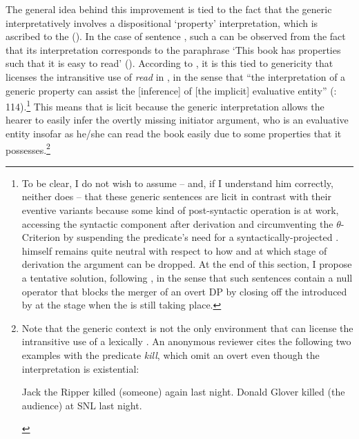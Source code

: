 \documentclass[output=paper,nonflat,newtxmath]{langsci/langscibook}
\begin{document}
\begin{exe}
\ex \label{ex:lenardic: 34}
\begin{xlist}
\label{ex:lenardic: 34a}
 \label{ex:lenardic: 34b}
\end{xlist}
\end{exe}

\noindent The general idea behind this improvement is tied to the fact that the generic   interpretatively involves a dispositional `property' interpretation, which is ascribed to the  (\citealt{lekakou2004}). In the case of sentence , such a  can be observed from the fact that its interpretation corresponds to the paraphrase `This book has properties such that it is easy to read' (\citealt{fagan1992}). According to \citeauthor{hartl2012}, it is this  tied to genericity that licenses the intransitive use of \textit{read} in , in the sense that “the interpretation of a generic property can assist the [inference] of [the implicit] evaluative entity'' (\citealt{hartl2012}: 114).\footnote{To be clear, I do not wish to assume -- and, if I understand him correctly, neither does \citeauthor{hartl2012} -- that  these generic sentences are licit in contrast with their eventive variants because  some kind of post-syntactic operation is at work,  accessing the syntactic component after derivation and circumventing the $\theta$-Criterion by suspending the predicate's need for a syntactically-projected . \citet{hartl2012} himself remains quite neutral with respect to how and at which stage of derivation the argument can be dropped.  At the end of this section, I propose a tentative solution, following \citet{bruening2012}, in the sense that such sentences contain a null operator that blocks the merger of an overt DP by closing off the  introduced by  at the stage when the  is still taking place.} This means that  is licit because the generic interpretation allows the hearer to easily infer the overtly missing initiator argument, who is an evaluative entity insofar as he/she can read the book easily due to some properties that it possesses.\footnote{Note that the generic context is not the only environment that can license the intransitive use of a lexically . An anonymous reviewer cites the following two examples with the predicate \textit{kill}, which omit an overt  even though the interpretation is existential: \begin{exe} \ex \label{fn 1} Jack the Ripper killed (someone) again last night. \ex \label{fn 2} Donald Glover killed (the audience) at SNL last night.\end{exe}
}
\end{document}
